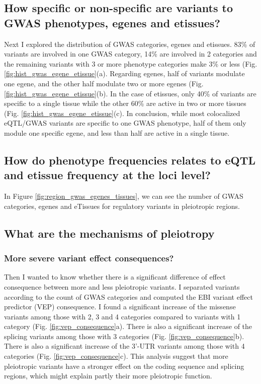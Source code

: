 \subsection*{How specific or non-specific are variants to GWAS phenotypes, egenes and etissues?}

Next I explored the distribution of GWAS categories, egenes and etissues.
%
83\% of variants are involved in one GWAS category, 14\% are involved in 2 categories and the remaining variants with 3 or more phenotype categories make 3\% or less (Fig. \ref{fig:hist_gwas_egene_etissue}(a).
%
Regarding egenes, half of variants modulate one egene, and the other half modulate two or more egenes (Fig. \ref{fig:hist_gwas_egene_etissue}(b).
%
In the case of etissues, only 40\% of variants are specific to a single tissue while the other 60\% are active in two or more tissues (Fig. \ref{fig:hist_gwas_egene_etissue}(c).
%
In conclusion, while most colocalized eQTL/GWAS variants are specific to one GWAS phenotype, half of them only module one specific egene, and less than half are active in a single tissue.

\subsection*{How do phenotype frequencies relates to eQTL and etissue frequency at the loci level?}


In Figure \ref{fig:region_gwas_egenes_tissues}, we can see the number of GWAS categories, egenes and eTissues for regulatory variants in pleiotropic regions.

\subsection*{What are the mechanisms of pleiotropy}

\subsubsection*{More severe variant effect consequences?}

Then I wanted to know whether there is a significant difference of effect consequence between more and less pleiotropic variants.
%
I separated variants according to the count of GWAS categories and computed the EBI variant effect predictor (VEP) consequence.
%
I found a significant increase of the missense variants among those with 2, 3 and 4 categories compared to variants with 1 category (Fig. \ref{fig:vep_consequence}a).
%
There is also a significant increase of the splicing variants among those with 3 categories (Fig. \ref{fig:vep_consequence}b).
%
There is also a significant increase of the 3'-UTR variants among those with 4 categories (Fig. \ref{fig:vep_consequence}c).
%
This analysis suggest that more pleiotropic variants have a stronger effect on the coding sequence and splicing regions, which might explain partly their more pleiotropic function.

